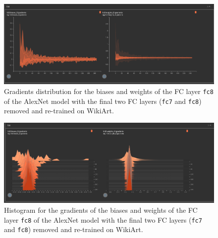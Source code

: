 \documentclass{article}
\def\code#1{\texttt{#1}}
\begin{document}
\begin{figure}[h]
	\centering
	\includegraphics[width=\linewidth]{images/distributions_fc8_2.png}
     \caption{Gradients distribution for the biases and weights of the FC layer \code{fc8} of the AlexNet model with the final two FC layers (\code{fc7} and \code{fc8}) removed and re-trained on WikiArt.}
\end{figure}

\begin{figure}[h]
		\includegraphics[width=\linewidth]{images/histogram_fc8_2.png} 
		\caption{Histogram for the gradients of the biases and weights of the FC layer \code{fc8} of the AlexNet model with the final two FC layers (\code{fc7} and \code{fc8}) removed and re-trained on WikiArt.}
\end{figure}	
\end{document}

